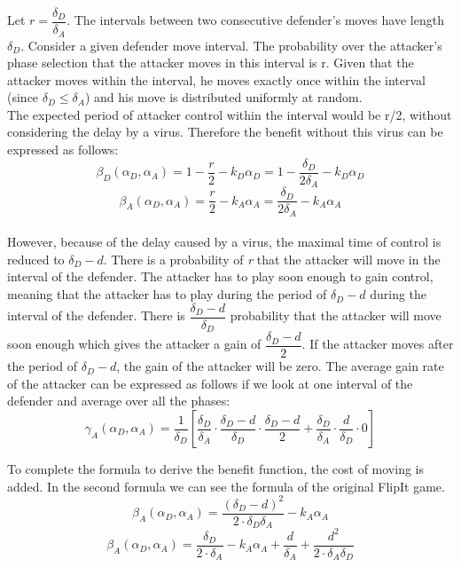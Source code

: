 \documentclass[journal,a4paper]{IEEEtran}
\begin{document}
Let $r = \dfrac{\delta_{D}}{ \delta_{A} }$. The intervals between two consecutive defender's moves have length $\delta_{D}$. Consider a given defender move interval. The probability over the attacker's phase selection that the attacker moves in this interval is r. Given that the attacker moves within the interval, he moves exactly once within the interval (since $\delta_{D} \leq \delta_{A} $) and his move is distributed uniformly at random. \\

The expected period of attacker control within the interval would be r/2, without considering the delay by a virus. Therefore the benefit without this virus can be expressed as follows:
\begin{equation}\label{first}
\beta_{D}(\alpha_{D},\alpha_{A}) =1 -  \dfrac {r} {2} - k_{D} \alpha_{D} = 1 - \dfrac {\delta_{D}} {2\delta_{A}} - k_{D} \alpha_{D} 
\end{equation}
\begin{equation}\label{first}
\beta_{A}(\alpha_{D},\alpha_{A}) =\dfrac {r} {2} - k_{A} \alpha_{A} = \dfrac {\delta_{D}} {2\delta_{A}} - k_{A} \alpha_{A}  
\end{equation}\\

However, because of the delay caused by a virus, the maximal time of control is reduced to $\delta_{D}-d$. There is a probability of \textit{r} that the attacker will move in the interval of the defender. The attacker has to play soon enough to gain control, meaning that the attacker has to play during the period of $\delta_{D}-d$ during the interval of the defender. There is $\dfrac{\delta_{D}-d}{\delta_{D}}$ probability that the attacker will move soon enough which gives the attacker a gain of $\dfrac{\delta_{D}-d}{2}$. If the attacker moves after the period of $\delta_{D}-d$, the gain of the attacker will be zero. The average gain rate of the attacker can be expressed as follows if we look at one interval of the defender and average over all the phases:
\begin{equation}\label{first}
\gamma_{A}(\alpha_{D},\alpha_{A}) = \dfrac {1}{\delta_{D}} [ \dfrac{\delta_{D}}{\delta_{A}} \cdot \dfrac{\delta_{D}-d}{\delta_{D}} \cdot \dfrac{\delta_{D}-d}{2} + \dfrac{\delta_{D}}{\delta_{A}} \cdot \dfrac{d}{\delta_{D}} \cdot 0 ]
\end{equation}

To complete the formula to derive the benefit function, the cost of moving is added. In the second formula we can see the formula of the original FlipIt game.
\begin{equation}\label{first}
\beta_{A}(\alpha_{D},\alpha_{A}) = \dfrac { (\delta_{D}-d) ^{2}} {2 \cdot \delta_{D}  \delta_{A}} - k_{A} \alpha_{A}
\end{equation}
\begin{equation}\label{first}
\beta_{A}(\alpha_{D},\alpha_{A}) = \dfrac { \delta_{D}} {2 \cdot \delta_{A}} - k_{A} \alpha_{A} + \dfrac{d}{\delta_{A}} + \dfrac{d^{2}}{2 \cdot \delta_{A} \delta_{D}}
\end{equation}
 
\end{document}
